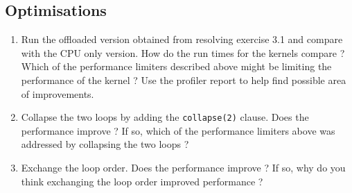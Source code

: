 \documentclass{article}
\begin{document}
\subsection{ Optimisations}
\begin{enumerate}
    \item Run the offloaded version obtained from resolving exercise 3.1 and compare with the CPU only version. How do the run times for the kernels compare ? Which of the performance limiters described above might be limiting the performance of the kernel ? Use the profiler report to help find possible area of improvements.
    \item Collapse the two loops by adding the \texttt{collapse(2)} clause. Does the performance improve ? If so, which of the performance limiters above  was addressed by collapsing the two loops ?
    \item Exchange the loop order. Does the performance improve ? If so, why do you think exchanging the loop order improved performance ?
\end{enumerate}
\end{document}
